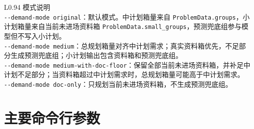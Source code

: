 \documentclass[UTF8,a4paper,11pt]{ctexart}
\newcommand{\code}[1]{\nolinkurl{#1}}
\begin{document}
\begin{longtable}{L{0.94\linewidth}}
\toprule
模式说明\\
\midrule
\code{--demand-mode original}：默认模式。中计划箱量来自 \code{ProblemData.groups}，小计划箱量来自当前未进场资料箱 \code{ProblemData.small_groups}，预测兜底组参与模型但不写入小计划。\\[0.25em]
\code{--demand-mode medium}：总规划箱量对齐中计划需求；真实资料箱优先，不足部分生成预测兜底组；小计划输出包含资料箱和预测兜底组。\\[0.25em]
\code{--demand-mode medium-with-doc-floor}：保留全部当前未进场资料箱，并补足中计划不足部分；当资料箱超过中计划需求时，总规划箱量可能高于中计划需求。\\[0.25em]
\code{--demand-mode doc-only}：只规划当前未进场资料箱，不生成预测兜底组。\\
\bottomrule
\end{longtable}

\section{主要命令行参数}
\end{document}
